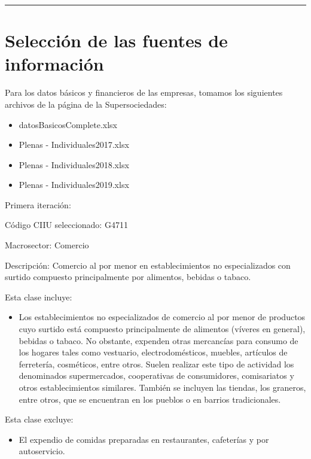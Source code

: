 \documentclass[
  11pt,
]{book}
\begin{document}
\begin{center}\rule{0.5\linewidth}{0.5pt}\end{center}

\hypertarget{selecciuxf3n-de-las-fuentes-de-informaciuxf3n}{%
\section{Selección de las fuentes de
información}\label{selecciuxf3n-de-las-fuentes-de-informaciuxf3n}}

Para los datos básicos y financieros de las empresas, tomamos los
siguientes archivos de la página de la Supersociedades:

\begin{itemize}
\item datosBasicosComplete.xlsx
\item Plenas - Individuales2017.xlsx
\item Plenas - Individuales2018.xlsx
\item Plenas - Individuales2019.xlsx
\end{itemize}

Primera iteración:

Código CIIU seleccionado: G4711

Macrosector: Comercio

Descripción: Comercio al por menor en establecimientos no especializados
con surtido compuesto principalmente por alimentos, bebidas o tabaco.

Esta clase incluye:

\begin{itemize}
\item Los establecimientos no especializados de comercio al por menor de productos cuyo surtido está compuesto principalmente de alimentos (víveres en general), bebidas o tabaco. No obstante, expenden otras mercancías para consumo de los hogares tales como vestuario, electrodomésticos, muebles, artículos de ferretería, cosméticos, entre otros. Suelen realizar este tipo de actividad los denominados supermercados, cooperativas de consumidores, comisariatos y otros establecimientos similares. También se incluyen las tiendas, los graneros, entre otros, que se encuentran en los pueblos o en barrios tradicionales.
\end{itemize}

Esta clase excluye:

\begin{itemize}
\item El expendio de comidas preparadas en restaurantes, cafeterías y por autoservicio.
\end{itemize}
\end{document}
